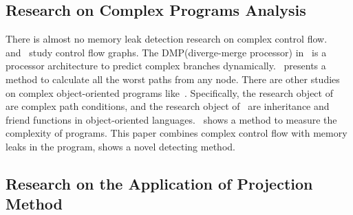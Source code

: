 \subsection{Research on Complex Programs Analysis}
There is almost no memory leak detection research on complex control flow.~\cite{KFM13} and~\cite{KJMP06} study control flow graphs. The DMP(diverge-merge processor) in~\cite{KJMP06} is a processor architecture to predict complex branches dynamically.~\cite{KFM13} presents a method to calculate all the worst paths from any node. There are other studies on complex object-oriented programs like~\cite{LLQ16, MGDD14}. Specifically, the research object of~\cite{LLQ16} are complex path conditions, and the research object of~\cite{MGDD14} are inheritance and friend functions in object-oriented languages.~\cite{KK12} shows a method to measure the complexity of programs. This paper combines complex control flow with memory leaks in the program, shows a novel detecting method.

\subsection{Research on the Application of Projection Method}

